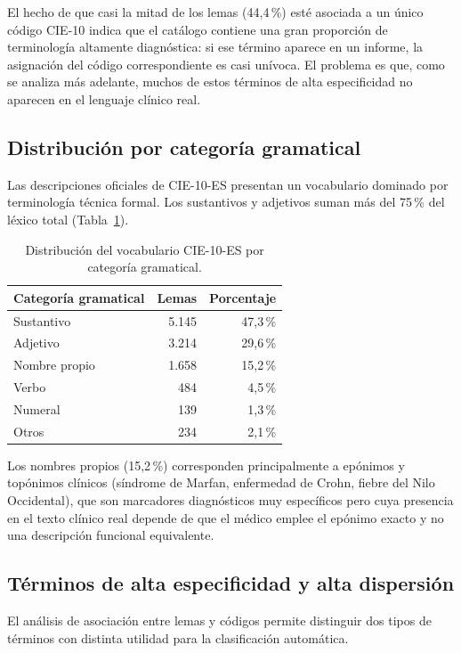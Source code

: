 El hecho de que casi la mitad de los lemas (44,4\,\%) esté asociada a un único código CIE-10 indica que el catálogo contiene una gran proporción de terminología altamente diagnóstica: si ese término aparece en un informe, la asignación del código correspondiente es casi unívoca. El problema es que, como se analiza más adelante, muchos de estos términos de alta especificidad no aparecen en el lenguaje clínico real.

\subsection{Distribución por categoría gramatical}

Las descripciones oficiales de CIE-10-ES presentan un vocabulario dominado por terminología técnica formal. Los sustantivos y adjetivos suman más del 75\,\% del léxico total (Tabla~\ref{tab:pos-dist}).

\begin{table}[h]
\centering
\caption{Distribución del vocabulario CIE-10-ES por categoría gramatical.}
\label{tab:pos-dist}
\begin{tabular}{lrr}
\hline
\textbf{Categoría gramatical} & \textbf{Lemas} & \textbf{Porcentaje} \\
\hline
Sustantivo & 5.145 & 47{,}3\,\% \\
Adjetivo & 3.214 & 29{,}6\,\% \\
Nombre propio & 1.658 & 15{,}2\,\% \\
Verbo & 484 & 4{,}5\,\% \\
Numeral & 139 & 1{,}3\,\% \\
Otros & 234 & 2{,}1\,\% \\
\hline
\end{tabular}
\end{table}

Los nombres propios (15,2\,\%) corresponden principalmente a epónimos y topónimos clínicos (síndrome de Marfan, enfermedad de Crohn, fiebre del Nilo Occidental), que son marcadores diagnósticos muy específicos pero cuya presencia en el texto clínico real depende de que el médico emplee el epónimo exacto y no una descripción funcional equivalente.

\subsection{Términos de alta especificidad y alta dispersión}

El análisis de asociación entre lemas y códigos permite distinguir dos tipos de términos con distinta utilidad para la clasificación automática.

